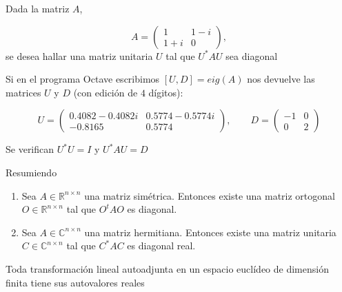 {\begin{example}
Dada la matriz $A$,

\begin{equation}
A= \left(\begin{array}{cc} 1 & 1-i  \\ 1+i & 0
\end{array}
 \right), 
\end{equation}
se desea hallar una matriz unitaria $U$ tal que $U^{*}AU$  sea diagonal
\end{example}
Si en el programa Octave escribimos $[U,D]= eig(A)$
\noindent
nos devuelve las matrices $U$ y $D$ (con edición de $4$  dígitos):


\begin{equation}
U= \left(\begin{array}{cc} 0.4082-0.4082i & 0.5774-0.5774i  \\ -0.8165 & 0.5774
\end{array}
 \right), \qquad  D= \left(\begin{array}{cc} -1 & 0  \\ 0 & 2
\end{array}
 \right)
\end{equation}

\bigskip

Se verifican $U^{*}U=I$ y $U^{*}AU=D$


\bigskip

\bigskip

Resumiendo


\begin{enumerate}

\item  Sea   $A \in \mathbb{R}^{n \times  n  }$  una matriz simétrica. Entonces existe una matriz ortogonal  $O\in \mathbb{R}^{n \times  n  }$ tal que 
$O^{t}AO$ es diagonal.



\item Sea   $A \in \mathbb{C}^{n \times  n  }$ una matriz hermitiana. Entonces existe una matriz unitaria $C\in \mathbb{C}^{n \times  n  }$ tal que 
$C^{*}AC$ es diagonal real.


\end{enumerate}


\bigskip


\begin{remark}
    Toda transformación lineal autoadjunta en un espacio euclídeo de dimensión finita tiene sus autovalores reales
\end{remark}
\bigskip

}
